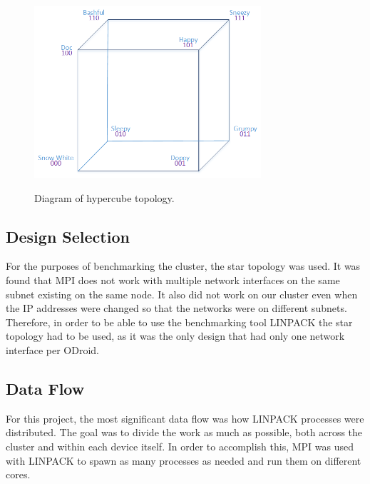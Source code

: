 \begin{figure}[tbh]
	\caption{Diagram of hypercube topology.}
	\centering
		\includegraphics[width=0.75\textwidth]{HyperCube2.png}
	\label{fig:hypercube}
\end{figure}


 \subsection{Design Selection}
For the purposes of benchmarking the cluster, the star topology was used. It was found that MPI does not work with multiple network interfaces on the same subnet existing on the same node. It also did not work on our cluster even when the IP addresses were changed so that the networks were on different subnets. Therefore, in order to be able to use the benchmarking tool LINPACK the star topology had to be used, as it was the only design that had only one network interface per ODroid.
 
	

 \subsection{Data Flow}
For this project, the most significant data flow was how LINPACK processes were distributed. The goal was to divide the work as much as possible, both across the cluster and within each device itself. In order to accomplish this, MPI was used with LINPACK to spawn as many processes as needed and run them on different cores. 
 
